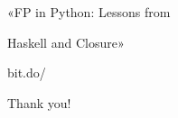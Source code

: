 \documentclass[aspectratio=169]{beamer}
\begin{document}
\begin{frame}
    \Huge{«FP in Python: Lessons from}

    \Huge{\hspace{0.59em}Haskell and Closure»}

    \vspace{1em}

    \Huge{bit.do/}
\end{frame}

\begin{frame}
    \centering
        \Huge{Thank you!}

\end{frame}
\end{document}
